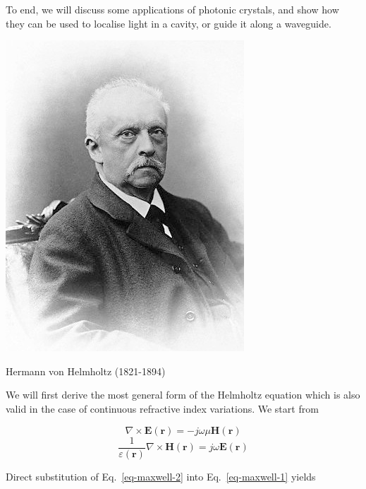 To end, we will discuss some applications of photonic crystals, and show how they can be used to localise light in a cavity, or guide it along a waveguide.

\pagebreak




\begin{marginfigure}[-0.0cm]
  \includegraphics{helmholtz/figures/Hermann_von_Helmholtz}
  \caption{Hermann von Helmholtz (1821-1894)}
\end{marginfigure}

We will first derive the most general form of the Helmholtz equation which is also valid in the case of continuous refractive index variations. We start from

\begin{equation}
\nabla \times {\mathbf E({\mathbf r})} = - j \omega \mu {\mathbf H({\mathbf r})} \label{eq-maxwell-1}
\end{equation}
\begin{equation}   
\frac{1}{\varepsilon({\mathbf r})}\nabla \times {\mathbf H({\mathbf r})} = j \omega {\mathbf E({\mathbf r})} \label{eq-maxwell-2}
\end{equation}

Direct substitution of Eq.~\ref{eq-maxwell-2} into Eq.~\ref{eq-maxwell-1} yields


